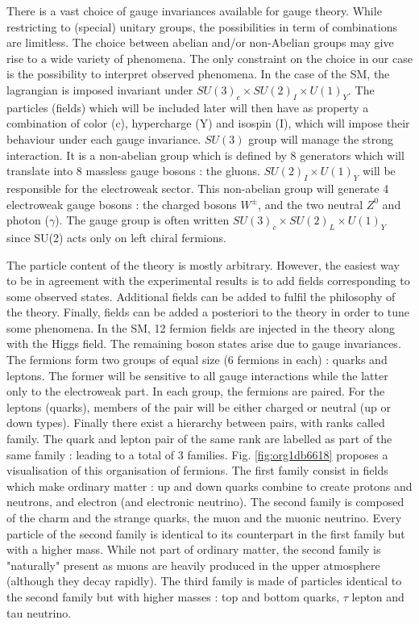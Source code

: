 There is a vast choice of gauge invariances available for gauge theory.
While restricting to (special) unitary groups, the possibilities in term of combinations are limitless.
The choice between abelian and/or non-Abelian groups may give rise to a wide variety of phenomena.
The only constraint on the choice in our case is the possibility to interpret observed phenomena.
In the case of the SM, the lagrangian is imposed invariant under \(SU(3)_c\times SU(2)_I\times U(1)_Y\).
The particles (fields) which will be included later will then have as property a combination of color (c), hypercharge (Y) and isospin (I), which will impose their behaviour under each gauge invariance.
\(SU(3)\) group will manage the strong interaction.
It is a non-abelian group which is defined by 8 generators which will translate into 8 massless gauge bosons : the gluons.
\(SU(2)_I\times U(1)_Y\) will be responsible for the electroweak sector.
This non-abelian group will generate 4 electroweak gauge bosons : the charged bosons \(W^{\pm}\), and the two neutral \(Z^0\) and photon (\(\gamma\)).
The gauge group is often written \(SU(3)_c \times SU(2)_L \times U(1)_Y\) since SU(2) acts only on left chiral fermions.

The particle content of the theory is mostly arbitrary.
However, the easiest way to be in agreement with the experimental results is to add fields corresponding to some observed states.
Additional fields can be added to fulfil the philosophy of the theory.
Finally, fields can be added a posteriori to the theory in order to tune some phenomena.
In the SM, 12 fermion fields are injected in the theory along with the Higgs field.
The remaining boson states arise due to gauge invariances.
The fermions form two groups of equal size (6 fermions in each) : quarks and leptons.
The former will be sensitive to all gauge interactions while the latter only to the electroweak part.
In each group, the fermions are paired.
For the leptons (quarks), members of the pair will be either charged or neutral (up or down types).
Finally there exist a hierarchy between pairs, with ranks called family.
The quark and lepton pair of the same rank are labelled as part of the same family : leading to a total of 3 families.
Fig. \ref{fig:org1db6618} proposes a visualisation of this organisation of fermions.
The first family consist in fields which make ordinary matter : up and down quarks combine to create protons and neutrons, and electron (and electronic neutrino).
The second family is composed of the charm and the strange quarks, the muon and the muonic neutrino.
Every particle of the second family is identical to its counterpart in the first family but with a higher mass.
While not part of ordinary matter, the second family is "naturally" present as muons are heavily produced in the upper atmosphere (although they decay rapidly).
The third family is made of particles identical to the second family but with higher masses : top and bottom quarks, \(\tau\) lepton and tau neutrino.

